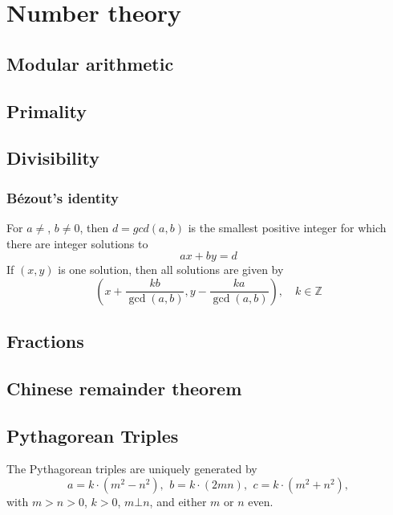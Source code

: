 \chapter{Number theory}

\section{Modular arithmetic}

\section{Primality}

\section{Divisibility}

	\subsection{Bézout's identity}
	For $a \neq $, $b \neq 0$, then $d=gcd(a,b)$ is the smallest positive integer for which there are integer solutions to
	$$ax+by=d$$
	If $(x,y)$ is one solution, then all solutions are given by
	$$\left(x+\frac{kb}{\gcd(a,b)}, y-\frac{ka}{\gcd(a,b)}\right), \quad k\in\mathbb{Z}$$


\section{Fractions}

\section{Chinese remainder theorem}

\section{Pythagorean Triples}
 The Pythagorean triples are uniquely generated by
 \[ a=k\cdot (m^{2}-n^{2}),\ \,b=k\cdot (2mn),\ \,c=k\cdot (m^{2}+n^{2}), \]
 with $m > n > 0$, $k > 0$, $m \bot n$, and either $m$ or $n$ even.

